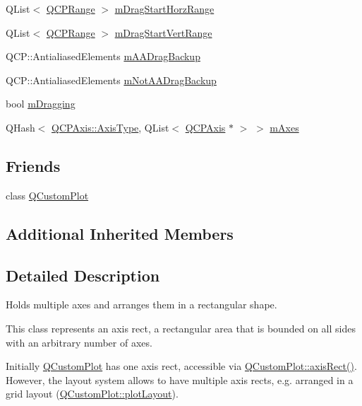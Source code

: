 \begin{DoxyCompactItemize}
\item 
Q\+List$<$ \mbox{\hyperlink{class_q_c_p_range}{Q\+C\+P\+Range}} $>$ \mbox{\hyperlink{class_q_c_p_axis_rect_a274aef08c4de084a3f26c3e92fac3a79}{m\+Drag\+Start\+Horz\+Range}}
\item 
Q\+List$<$ \mbox{\hyperlink{class_q_c_p_range}{Q\+C\+P\+Range}} $>$ \mbox{\hyperlink{class_q_c_p_axis_rect_ab362ee8f71a156d812a1ea793a1e42cb}{m\+Drag\+Start\+Vert\+Range}}
\item 
Q\+C\+P\+::\+Antialiased\+Elements \mbox{\hyperlink{class_q_c_p_axis_rect_aa4a24f76360cfebe1bcf17a77fa7521b}{m\+A\+A\+Drag\+Backup}}
\item 
Q\+C\+P\+::\+Antialiased\+Elements \mbox{\hyperlink{class_q_c_p_axis_rect_a6fcb12e052e276d57efbb128be31d6f5}{m\+Not\+A\+A\+Drag\+Backup}}
\item 
bool \mbox{\hyperlink{class_q_c_p_axis_rect_ab49a6698194cf0e9e38a1d734c0888a8}{m\+Dragging}}
\item 
Q\+Hash$<$ \mbox{\hyperlink{class_q_c_p_axis_ae2bcc1728b382f10f064612b368bc18a}{Q\+C\+P\+Axis\+::\+Axis\+Type}}, Q\+List$<$ \mbox{\hyperlink{class_q_c_p_axis}{Q\+C\+P\+Axis}} $\ast$ $>$ $>$ \mbox{\hyperlink{class_q_c_p_axis_rect_afe7a24d2a2bea98fc552fa826350ba81}{m\+Axes}}
\end{DoxyCompactItemize}
\subsection*{Friends}
\begin{DoxyCompactItemize}
\item 
class \mbox{\hyperlink{class_q_c_p_axis_rect_a1cdf9df76adcfae45261690aa0ca2198}{Q\+Custom\+Plot}}
\end{DoxyCompactItemize}
\subsection*{Additional Inherited Members}


\subsection{Detailed Description}
Holds multiple axes and arranges them in a rectangular shape. 

This class represents an axis rect, a rectangular area that is bounded on all sides with an arbitrary number of axes.

Initially \mbox{\hyperlink{class_q_custom_plot}{Q\+Custom\+Plot}} has one axis rect, accessible via \mbox{\hyperlink{class_q_custom_plot_ae5eefcb5f6ca26689b1fd4f6e25b42f9}{Q\+Custom\+Plot\+::axis\+Rect()}}. However, the layout system allows to have multiple axis rects, e.\+g. arranged in a grid layout (\mbox{\hyperlink{class_q_custom_plot_af1a1f1f571237deb7c2bd34a5e9f018f}{Q\+Custom\+Plot\+::plot\+Layout}}).

